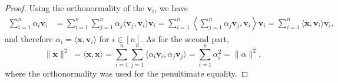 \begin{proof}
    Using the orthonormality of the $\bm{v}_i$, we have
    \begin{align*}
        \sum \limits_{i = 1}^n \alpha_i \bm{v}_i 
            &= \sum \limits_{i = 1}^n \sum \limits_{j = 1}^n \alpha_j \langle \bm{v}_j, \bm{v}_i \rangle \bm{v}_i 
            = \sum \limits_{i = 1}^n \left \langle \sum \limits_{j = 1}^n \alpha_j \bm{v}_j, \bm{v}_i \right \rangle \bm{v}_i 
                = \sum \limits_{i = 1}^n \langle \bm{x}, \bm{v}_i \rangle \bm{v}_i,
    \end{align*}
    and therefore $\alpha_i = \langle \bm{x}, \bm{v}_i \rangle$ for $i \in [n]$. 
    As for the second part, 
    \begin{equation*}
        \| \bm{x} \|^2 \;= \langle \bm{x}, \bm{x} \rangle 
            = \sum \limits_{i = 1}^n \sum \limits_{j = 1}^n \langle \alpha_i \bm{v}_i, \alpha_j \bm{v}_j \rangle  = \sum \limits_{i = 1}^n \alpha_i ^2 = \| \alpha \|^2,
    \end{equation*}
    where the orthonormality was used for the penultimate equality.
\end{proof}


